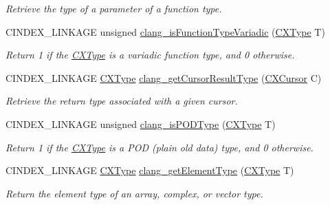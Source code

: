 \begin{DoxyCompactItemize}
\begin{DoxyCompactList}\small\item\em Retrieve the type of a parameter of a function type. \end{DoxyCompactList}\item 
\mbox{\label{group__CINDEX__TYPES_ga343b2463b0ed4b259739242cf26c3ae2}} 
C\+I\+N\+D\+E\+X\+\_\+\+L\+I\+N\+K\+A\+GE unsigned \mbox{\hyperlink{group__CINDEX__TYPES_ga343b2463b0ed4b259739242cf26c3ae2}{clang\+\_\+is\+Function\+Type\+Variadic}} (\mbox{\hyperlink{structCXType}{C\+X\+Type}} T)
\begin{DoxyCompactList}\small\item\em Return 1 if the \mbox{\hyperlink{structCXType}{C\+X\+Type}} is a variadic function type, and 0 otherwise. \end{DoxyCompactList}\item 
C\+I\+N\+D\+E\+X\+\_\+\+L\+I\+N\+K\+A\+GE \mbox{\hyperlink{structCXType}{C\+X\+Type}} \mbox{\hyperlink{group__CINDEX__TYPES_ga6995a2d6352e7136868574b299005a63}{clang\+\_\+get\+Cursor\+Result\+Type}} (\mbox{\hyperlink{structCXCursor}{C\+X\+Cursor}} C)
\begin{DoxyCompactList}\small\item\em Retrieve the return type associated with a given cursor. \end{DoxyCompactList}\item 
\mbox{\label{group__CINDEX__TYPES_ga3e7fdbe3d246ed03298bd074c5b3703e}} 
C\+I\+N\+D\+E\+X\+\_\+\+L\+I\+N\+K\+A\+GE unsigned \mbox{\hyperlink{group__CINDEX__TYPES_ga3e7fdbe3d246ed03298bd074c5b3703e}{clang\+\_\+is\+P\+O\+D\+Type}} (\mbox{\hyperlink{structCXType}{C\+X\+Type}} T)
\begin{DoxyCompactList}\small\item\em Return 1 if the \mbox{\hyperlink{structCXType}{C\+X\+Type}} is a P\+OD (plain old data) type, and 0 otherwise. \end{DoxyCompactList}\item 
C\+I\+N\+D\+E\+X\+\_\+\+L\+I\+N\+K\+A\+GE \mbox{\hyperlink{structCXType}{C\+X\+Type}} \mbox{\hyperlink{group__CINDEX__TYPES_gab35027c8bc48fab25f7698a415c93922}{clang\+\_\+get\+Element\+Type}} (\mbox{\hyperlink{structCXType}{C\+X\+Type}} T)
\begin{DoxyCompactList}\small\item\em Return the element type of an array, complex, or vector type. \end{DoxyCompactList}\item 

\end{DoxyCompactItemize}
